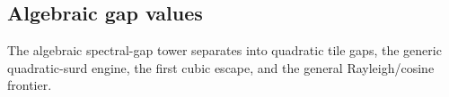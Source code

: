 \subsection{Algebraic gap values}

The algebraic spectral-gap tower separates into quadratic tile gaps, the
generic quadratic-surd engine, the first cubic escape, and the general
Rayleigh/cosine frontier.





